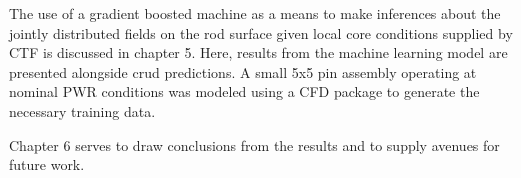 The use of a gradient boosted machine as a means to make inferences about the jointly distributed fields on the rod surface given local core conditions supplied by CTF is discussed in chapter 5.  Here, results from the machine learning model are presented alongside crud predictions.  A small 5x5 pin assembly operating at nominal PWR conditions was modeled using a CFD package to generate the necessary training data.

Chapter 6 serves to draw conclusions from the results and to supply avenues for future work.   

